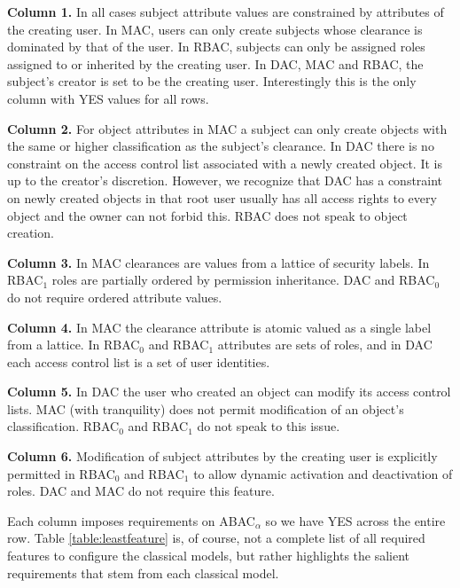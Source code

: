 \noindent \textbf{Column 1.}
In all cases subject attribute values are constrained by attributes of the creating user. In MAC, users can only create
subjects whose clearance is dominated by that of the user. In RBAC, subjects
can only be assigned roles assigned to or inherited by the creating user.
In DAC, MAC and RBAC, the subject's creator is set to be the creating user. Interestingly this is the only column with YES values for all rows.

\noindent \textbf{Column 2.}
For object attributes in MAC a subject can only create objects with the same or higher classification as the subject's clearance. In DAC there is no constraint on the access control list associated with a newly created object. It is up to the creator's discretion. However, we recognize that DAC has a constraint on newly created objects in that root user usually has all access rights to every object and the owner can not forbid this. RBAC does not speak to object creation.

\noindent \textbf{Column 3.}
In MAC clearances are values from a lattice of security labels. In
RBAC$_1$ roles are partially ordered by permission inheritance.  DAC and RBAC$_0$ do not require ordered attribute values.

\noindent \textbf{Column 4.}
In MAC the clearance attribute is atomic valued as a single label from a lattice.
In RBAC$_{0}$ and RBAC$_{1}$ attributes are sets of roles, and in DAC each access control list is a set of user identities.

\noindent \textbf{Column 5.}
In DAC the user who created an object can modify its access control lists.  MAC (with tranquility) does not permit modification of an object's classification.  RBAC$_{0}$ and RBAC$_{1}$ do not speak to this issue.

\noindent \textbf{Column 6.}
Modification of subject attributes by the creating user is explicitly permitted in RBAC$_{0}$ and RBAC$_{1}$ to allow dynamic activation and deactivation of roles.  DAC and MAC do not require this feature.

Each column imposes requirements on ABAC$_{\alpha}$ so we have YES across the entire row.  Table \ref{table:leastfeature} is, of course, not a complete list of all required features to configure the
classical models, but rather highlights the salient requirements that stem from each classical model.


